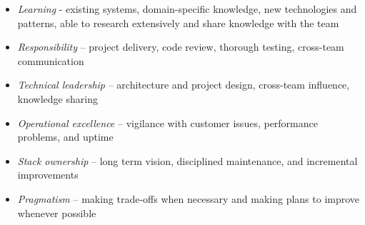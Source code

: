 \begin{multicols}{2}
\begin{itemize}
    \item \textit{Learning} - existing systems, domain-specific knowledge, new technologies and patterns, able to research extensively and share knowledge with the team
    \item \textit{Responsibility} – project delivery, code review, thorough testing, cross-team communication
    \item \textit{Technical leadership} – architecture and project design, cross-team influence, knowledge sharing
    \item \textit{Operational excellence} – vigilance with customer issues, performance problems, and uptime
    \item \textit{Stack ownership} – long term vision, disciplined maintenance, and incremental improvements
    \item \textit{Pragmatism} – making trade-offs when necessary and making plans to improve whenever possible
\end{itemize}
\end{multicols}
